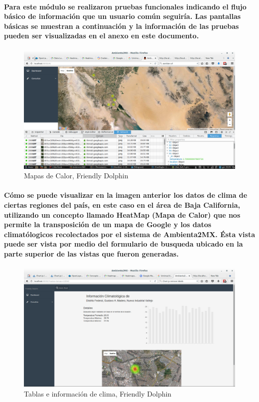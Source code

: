     \paragraph{Para este módulo se realizaron pruebas funcionales indicando el flujo básico de información que un usuario común seguiría. Las pantallas básicas se muestran a continuación y la información de las pruebas pueden ser visualizadas en el anexo en este documento.}
    \begin{figure}[b!]
      \centering
        \includegraphics[width=\textwidth]{./images/CapturaFriendlyDolphin}
      \caption{Mapas de Calor, Friendly Dolphin}
    \end{figure}
    \paragraph{Cómo se puede visualizar en la imagen anterior los datos de clima de ciertas regiones del país, en este caso en el área de Baja California, utilizando un concepto llamado HeatMap (Mapa de Calor) que nos permite la transposición de un mapa de Google y los datos climatólogicos recolectados por el sistema de Ambienta2MX. Ésta vista puede ser vista por medio del formulario de busqueda ubicado en la parte superior de las vistas que fueron generadas.}
    \begin{figure}[b!]
      \centering
        \includegraphics[width=\textwidth]{./images/CapturaFriendlyDolphin2}
      \caption{Tablas e información de clima, Friendly Dolphin}
    \end{figure}
